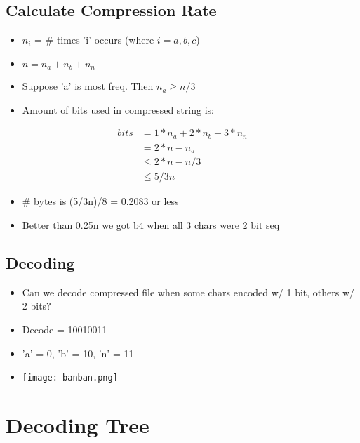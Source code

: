 \documentclass{article}
\begin{document}
\begin{multicols}{2}
\subsection{Calculate Compression Rate}
        \begin{itemize}
            \item $n_i$ = \# times 'i' occurs (where $i = a, b, c$)
            \item $n = n_a + n_b + n_n$
            \item Suppose 'a' is most freq. Then $n_a \geq n/3$
            \item Amount of bits used in compressed string is:
        \end{itemize}
    \vspace{-1.2em}
        \begin{align*}
            bits &= 1*n_a + 2*n_b + 3*n_n \\
            &= 2*n - n_a \\
            &\leq 2*n - n/3 \\
            &\leq 5/3n
        \end{align*}
        \begin{itemize}
            \item \# bytes is (5/3n)/8 = 0.2083 or less
            \item Better than 0.25n we got b4 when all 3 chars were 2 bit seq
        \end{itemize}

\subsection{Decoding}
    \begin{itemize}
        \item Can we decode compressed file when some chars encoded w/ 1 bit, others w/ 2 bits?
        \item Decode = 10010011
        \item 'a' = 0, 'b' = 10, 'n' = 11
        \item \texttt{[image: banban.png]}
    \end{itemize}

\end{multicols}

\section{Decoding Tree}
\end{document}
